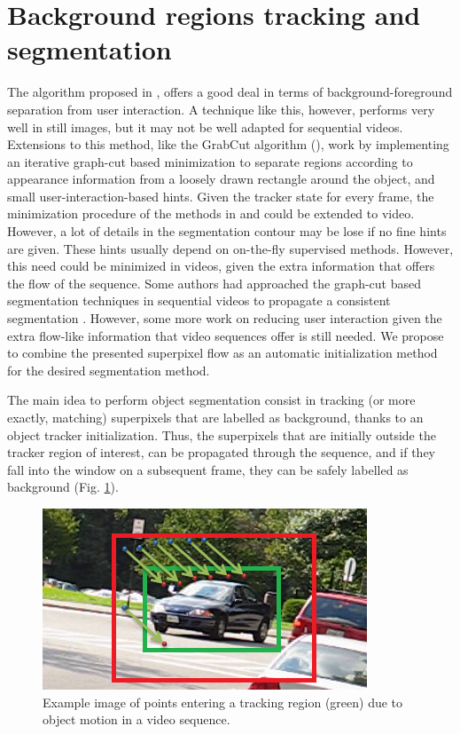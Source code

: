 
\section{Background regions tracking and segmentation}
\label{sec:segm}
The algorithm proposed in \cite{c18}, offers a good deal in terms of
background-foreground separation from user interaction. A technique like this, however,
performs very well in still images, but it may not be well adapted for sequential videos. 
Extensions to this method, like the GrabCut algorithm (\cite{c14}), work by implementing an iterative graph-cut based 
minimization to separate regions according to appearance information from a loosely drawn rectangle around the object, and small user-interaction-based hints. 
Given the tracker state for every frame, the minimization procedure of the methods in \cite{c18} and \cite{c14} could be extended to video. However, 
a lot of details in the segmentation contour may be lose if no fine hints are given.
These hints usually depend on on-the-fly supervised methods. However, this need could be minimized in videos, given the extra information that offers the flow of the sequence.
Some authors had approached the graph-cut based segmentation techniques in sequential
videos to propagate a consistent segmentation \cite{c15}. However, some more work on reducing user interaction given the extra flow-like information
that video sequences offer is still needed.
We propose to combine the presented superpixel flow as an automatic initialization method for the desired segmentation method.
 
The main idea to perform object segmentation consist in tracking (or more exactly, matching) superpixels that are labelled as background, thanks to an object tracker initialization. Thus, the superpixels that are initially outside the tracker region of interest, 
can be propagated through the sequence, and if they fall into the window on a subsequent frame, they
can be safely labelled as background (Fig.  \ref{figurelabel_entering}). \\

   \begin{figure}[thpb]
      \centering
      \includegraphics[height=0.25\textheight]{../images/tracking_points.png}
      \caption{Example image of points entering a tracking region (green) due to object motion in a video sequence.}
      \label{figurelabel_entering}
   \end{figure}
\setlength{\belowcaptionskip}{-10pt}

